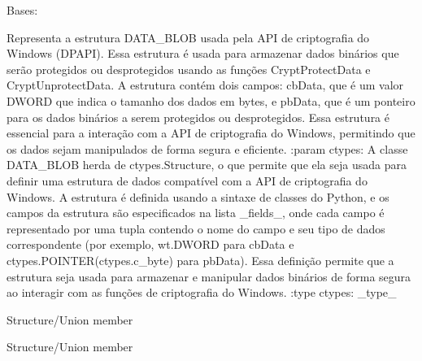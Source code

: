\documentclass[letterpaper,10pt,english]{sphinxmanual}
\begin{document}
\begin{fulllineitems}
\label{\detokenize{api/simple_lock:simple_lock.DATA_BLOB}}
\pysigstartsignatures
\pysigline
{}
\pysigstopsignatures
\sphinxAtStartPar
Bases: 

\sphinxAtStartPar
Representa a estrutura DATA\_BLOB usada pela API de criptografia do Windows (DPAPI). Essa estrutura é usada para armazenar dados binários que serão protegidos ou desprotegidos usando as funções CryptProtectData e CryptUnprotectData. A estrutura contém dois campos: cbData, que é um valor DWORD que indica o tamanho dos dados em bytes, e pbData, que é um ponteiro para os dados binários a serem protegidos ou desprotegidos. Essa estrutura é essencial para a interação com a API de criptografia do Windows, permitindo que os dados sejam manipulados de forma segura e eficiente.
:param ctypes: A classe DATA\_BLOB herda de ctypes.Structure, o que permite que ela seja usada para definir uma estrutura de dados compatível com a API de criptografia do Windows. A estrutura é definida usando a sintaxe de classes do Python, e os campos da estrutura são especificados na lista \_fields\_, onde cada campo é representado por uma tupla contendo o nome do campo e seu tipo de dados correspondente (por exemplo, wt.DWORD para cbData e ctypes.POINTER(ctypes.c\_byte) para pbData). Essa definição permite que a estrutura seja usada para armazenar e manipular dados binários de forma segura ao interagir com as funções de criptografia do Windows.
:type ctypes: \_type\_

\begin{fulllineitems}
\label{\detokenize{api/simple_lock:simple_lock.DATA_BLOB.cbData}}
\pysigstartsignatures
\pysigline
{}
\pysigstopsignatures
\sphinxAtStartPar
Structure/Union member

\end{fulllineitems}


\begin{fulllineitems}
\label{\detokenize{api/simple_lock:simple_lock.DATA_BLOB.pbData}}
\pysigstartsignatures
\pysigline
{}
\pysigstopsignatures
\sphinxAtStartPar
Structure/Union member

\end{fulllineitems}


\end{fulllineitems}
\end{document}
